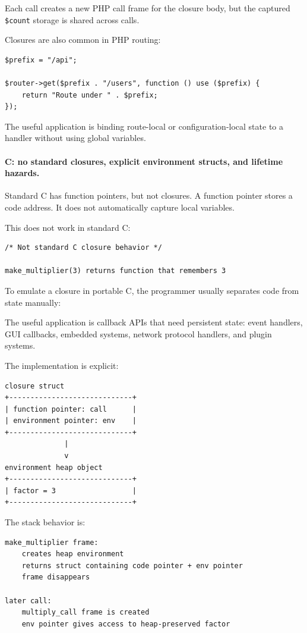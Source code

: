 Each call creates a new PHP call frame for the closure body, but the captured \texttt{\$count} storage is shared across calls.

Closures are also common in PHP routing:

\begin{verbatim}
$prefix = "/api";

$router->get($prefix . "/users", function () use ($prefix) {
    return "Route under " . $prefix;
});
\end{verbatim}

The useful application is binding route-local or configuration-local state to a handler without using global variables.

\paragraph{C: no standard closures, explicit environment structs, and lifetime hazards.}

Standard C has function pointers, but not closures. A function pointer stores a code address. It does not automatically capture local variables.

This does not work in standard C:

\begin{verbatim}
/* Not standard C closure behavior */

make_multiplier(3) returns function that remembers 3
\end{verbatim}

To emulate a closure in portable C, the programmer usually separates code from state manually:

The useful application is callback APIs that need persistent state: event handlers, GUI callbacks, embedded systems, network protocol handlers, and plugin systems.

The implementation is explicit:

\begin{verbatim}
closure struct
+-----------------------------+
| function pointer: call      |
| environment pointer: env    |
+-----------------------------+
              |
              v
environment heap object
+-----------------------------+
| factor = 3                  |
+-----------------------------+
\end{verbatim}

The stack behavior is:

\begin{verbatim}
make_multiplier frame:
    creates heap environment
    returns struct containing code pointer + env pointer
    frame disappears

later call:
    multiply_call frame is created
    env pointer gives access to heap-preserved factor
\end{verbatim}

